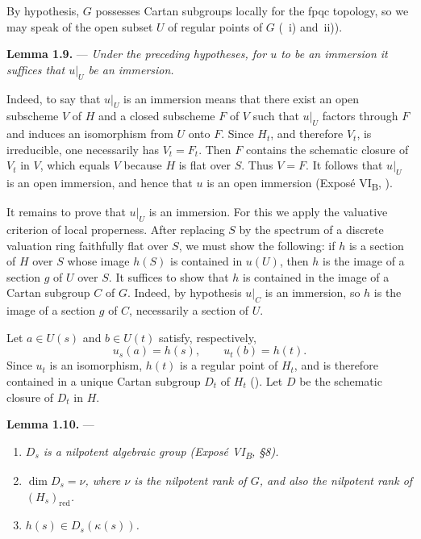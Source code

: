By hypothesis, \(G\) possesses Cartan subgroups locally for the fpqc
topology, so we may speak of the open subset \(U\) of regular points
of \(G\) (~i) and~ii)).

\medskip
\noindent{}%
\textbf{Lemma 1.9.} --- \textit{Under the preceding hypotheses, for
\(u\) to be an immersion it suffices that \(u|_U\) be an immersion.}

Indeed, to say that \(u|_U\) is an immersion means that there exist
an open subscheme \(V\) of \(H\) and a closed subscheme \(F\) of
\(V\) such that \(u|_U\) factors through \(F\) and induces an
isomorphism from \(U\) onto \(F\). Since \(H_t\), and therefore
\(V_t\), is irreducible, one necessarily has \(V_t=F_t\). Then \(F\)
contains the schematic closure of \(V_t\) in \(V\), which equals
\(V\) because \(H\) is flat over \(S\). Thus \(V=F\). It follows
that \(u|_U\) is an open immersion, and hence that \(u\) is an open
immersion (Exposé VI\textsubscript{B}, ).

It remains to prove that \(u|_U\) is an immersion. For this we apply
the valuative criterion of local properness. After replacing \(S\)
by the spectrum of a discrete valuation ring faithfully flat over
\(S\), we must show the following: if \(h\) is a section of \(H\)
over \(S\) whose image \(h(S)\) is contained in \(u(U)\), then \(h\)
is the image of a section \(g\) of \(U\) over \(S\). It suffices to
show that \(h\) is contained in the image of a Cartan subgroup \(C\)
of \(G\). Indeed, by hypothesis \(u|_C\) is an immersion, so \(h\)
is the image of a section \(g\) of \(C\), necessarily a section of
\(U\).

Let \(a\in U(s)\) and \(b\in U(t)\) satisfy, respectively,
\[
  u_s(a)=h(s),
  \qquad
  u_t(b)=h(t).
\]
Since \(u_t\) is an isomorphism, \(h(t)\) is a regular point of
\(H_t\), and is therefore contained in a unique Cartan subgroup
\(D_t\) of \(H_t\) (). Let \(D\) be the schematic
closure of \(D_t\) in \(H\).

\medskip
\noindent{}%
\textbf{Lemma 1.10.} ---
\begin{enumerate}
\item[\textit{i)}] \textit{\(D_s\) is a nilpotent algebraic group
(Exposé VI\textsubscript{B}, \S8).}
\item[\textit{ii)}] \textit{\(\dim D_s=\nu\), where \(\nu\) is the
nilpotent rank of \(G\), and also the nilpotent rank of
\((H_s)_{\mathrm{red}}\).}
\item[\textit{iii)}] \textit{\(h(s)\in D_s(\kappa(s))\).}
\end{enumerate}

